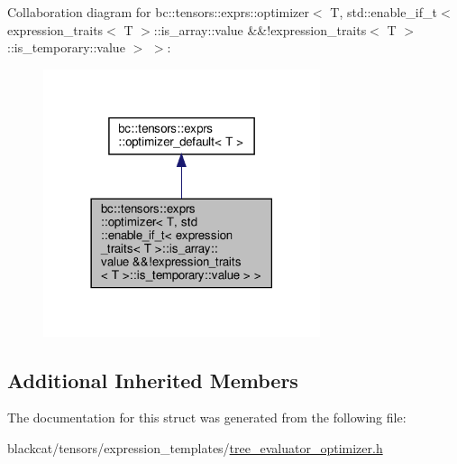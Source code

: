 Collaboration diagram for bc\+:\+:tensors\+:\+:exprs\+:\+:optimizer$<$ T, std\+:\+:enable\+\_\+if\+\_\+t$<$ expression\+\_\+traits$<$ T $>$\+:\+:is\+\_\+array\+:\+:value \&\&!expression\+\_\+traits$<$ T $>$\+:\+:is\+\_\+temporary\+:\+:value $>$ $>$\+:\nopagebreak
\begin{figure}[H]
\begin{center}
\leavevmode
\includegraphics[width=230pt]{structbc_1_1tensors_1_1exprs_1_1optimizer_3_01T_00_01std_1_1enable__if__t_3_01expression__traits4ad13d2e1a35a7d67a8477f27b8b0ae6}
\end{center}
\end{figure}
\subsection*{Additional Inherited Members}


The documentation for this struct was generated from the following file\+:\begin{DoxyCompactItemize}
\item 
blackcat/tensors/expression\+\_\+templates/\hyperlink{tree__evaluator__optimizer_8h}{tree\+\_\+evaluator\+\_\+optimizer.\+h}\end{DoxyCompactItemize}
